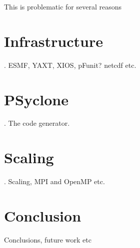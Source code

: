 \documentclass[times]{elsarticle}
\begin{document}
This is problematic for several reasons 
\section{\label{sec:lib}Infrastructure}.
ESMF, YAXT, XIOS, pFunit? netcdf etc.

\section{\label{sec:Psyclone}PSyclone}.
The code generator.

\section{\label{sec:scal}Scaling}.
Scaling, MPI and OpenMP etc.

\section{Conclusion}
\label{sec:con}
Conclusions, future work etc



\end{document}
